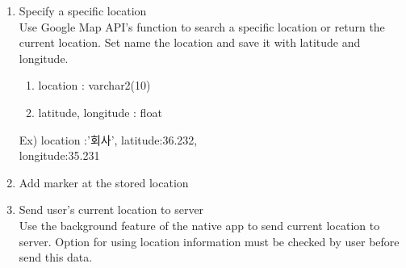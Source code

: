 \documentclass[conference]{IEEEtran}
\begin{document}
\begin{enumerate}
\begin{enumerate}
        \item Specify a specific location\\
              Use Google Map API’s function to search a specific location or return the current location. Set name the location and save it with latitude and longitude.
              \begin{enumerate}
                  \item location : varchar2(10)
                  \item latitude, longitude : float
              \end{enumerate}
        Ex) location :’회사’, latitude:36.232,\\
        longitude:35.231
        \item Add marker at the stored location
        \item Send user’s current location to server\\
        Use the background feature of the native app to send current location to server. Option for using location information must be checked by user before send this data.
    \end{enumerate}
\end{enumerate}
\end{document}
